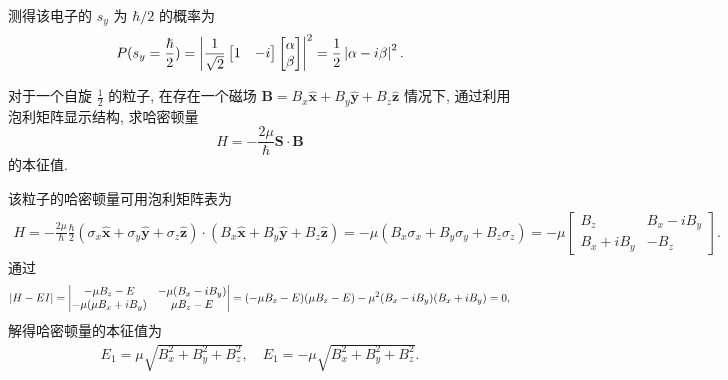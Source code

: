 \documentclass{assignment}
\begin{document}
\begin{sol}
    测得该电子的 $s_y$ 为 $\hbar/2$ 的概率为
    \begin{align}
        P(s_y=\frac{\hbar}{2})=\left\lvert\frac{1}{\sqrt{2}}\begin{bmatrix}
            1&-i
        \end{bmatrix}\begin{bmatrix}
            \alpha\\
            \beta
        \end{bmatrix}\right\rvert^2=\frac{1}{2}\left\lvert\alpha-i\beta\right\rvert^2.
    \end{align}
\end{sol}

\begin{prob}[课本习题 3.2]
    对于一个自旋 $\frac{1}{2}$ 的粒子, 在存在一个磁场 $\bm{B}=B_x\hat{\bm{x}}+B_y\hat{\bm{y}}+B_z\hat{\bm{z}}$ 情况下, 通过利用泡利矩阵显示结构, 求哈密顿量
    \[
        H=-\frac{2\mu}{\hbar}\bm{S}\cdot\bm{B}
    \]
    的本征值.
\end{prob}
\begin{sol}
    该粒子的哈密顿量可用泡利矩阵表为
    \begin{align}
        H=-\frac{2\mu}{\hbar}\frac{\hbar}{2}(\sigma_x\hat{\bm{x}}+\sigma_y\hat{\bm{y}}+\sigma_z\hat{\bm{z}})\cdot(B_x\hat{\bm{x}}+B_y\hat{\bm{y}}+B_z\hat{\bm{z}})=-\mu(B_x\sigma_x+B_y\sigma_y+B_z\sigma_z)=-\mu\begin{bmatrix}
            B_z&B_x-iB_y\\
            B_x+iB_y&-B_z
        \end{bmatrix}.
    \end{align}
    通过
    \begin{align}
        \left\lvert H-EI\right\rvert=\begin{vmatrix}
            -\mu B_z-E&-\mu(B_x-iB_y)\\
            -\mu(\mu B_x+iB_y)&\mu B_z-E
        \end{vmatrix}=(-\mu B_z-E)(\mu B_z-E)-\mu^2(B_x-iB_y)(B_x+iB_y)=0,
    \end{align}
    解得哈密顿量的本征值为
    \begin{align}
        E_1=\mu\sqrt{B_x^2+B_y^2+B_z^2},\quad E_1=-\mu\sqrt{B_x^2+B_y^2+B_z^2}.
    \end{align}
\end{sol}
\end{document}
